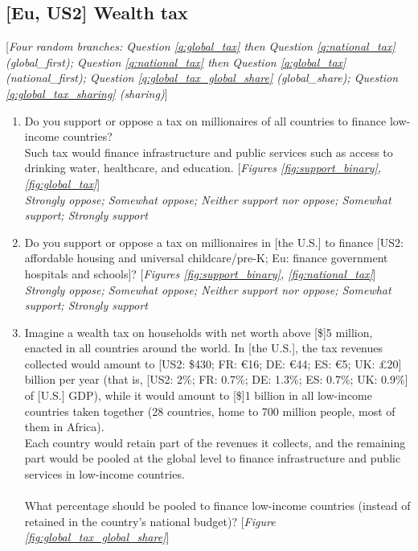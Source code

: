 \subsection*{[Eu, US2] Wealth tax}
[\textit{Four random branches: Question \ref{q:global_tax} then Question \ref{q:national_tax} (global\_first); Question \ref{q:national_tax} then Question \ref{q:global_tax} (national\_first); Question \ref{q:global_tax_global_share} (global\_share); Question \ref{q:global_tax_sharing} (sharing)}]
\begin{enumerate}[resume] 
    \item \label{q:global_tax} Do you support or oppose a tax on millionaires of all countries to finance low-income countries? \\
    Such tax would finance infrastructure and public services such as access to drinking water, healthcare, and education. [\textit{Figures \ref{fig:support_binary}, \ref{fig:global_tax}}]
   \\ \textit{Strongly oppose; Somewhat oppose; Neither support nor oppose; Somewhat support; Strongly support}
   \item \label{q:national_tax} Do you support or oppose a tax on millionaires in [the U.S.] to finance [US2: affordable housing and universal childcare/pre-K; Eu: finance government hospitals and schools]?  [\textit{Figures \ref{fig:support_binary},  \ref{fig:national_tax}}]
  \\ \textit{Strongly oppose; Somewhat oppose; Neither support nor oppose; Somewhat support; Strongly support}
  \item \label{q:global_tax_global_share} Imagine a wealth tax on households with net worth above [\$]5 million, enacted in all countries around the world.  
  In [the U.S.], the tax revenues collected would amount to [US2: \$430; FR: \euro{}16; DE: \euro{}44; ES: \euro{}5; UK: £20] billion per year (that is, [US2: 2\%; FR: 0.7\%; DE: 1.3\%; ES: 0.7\%; UK: 0.9\%] of [U.S.] GDP), while it would amount to [\$]1 billion in all low-income countries taken together (28 countries, home to 700 million people, most of them in Africa).  \\
  Each country would retain part of the revenues it collects, and the remaining part would be pooled at the global level to finance infrastructure and public services in low-income countries.  \\
     \\
  What percentage should be pooled to finance low-income countries (instead of retained in the country's national budget)?  [\textit{Figure \ref{fig:global_tax_global_share}}]

\end{enumerate}
